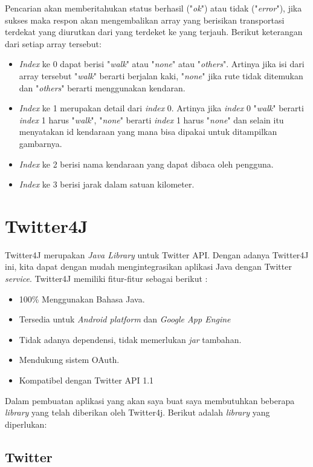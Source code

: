Pencarian akan memberitahukan status berhasil ("\textit{ok}") atau tidak ("\textit{error}"), jika sukses maka respon akan mengembalikan array yang berisikan transportasi terdekat yang diurutkan dari yang terdeket ke yang terjauh. Berikut keterangan dari setiap array tersebut: 
\begin{itemize}
	\item \textit{Index} ke 0 dapat berisi "\textit{walk}" atau "\textit{none}" atau "\textit{others}". Artinya  jika isi dari array tersebut "\textit{walk}" berarti berjalan kaki, "\textit{none}" jika rute tidak ditemukan dan "\textit{others}" berarti menggunakan kendaran.
	\item \textit{Index} ke 1 merupakan detail dari \textit{index} 0. Artinya jika \textit{index} 0 "\textit{walk}" berarti \textit{index} 1 harus "\textit{walk}", "\textit{none}" berarti \textit{index} 1 harus "\textit{none}" dan selain itu menyatakan id kendaraan yang mana bisa dipakai untuk ditampilkan gambarnya.
	\item \textit{Index} ke 2 berisi nama kendaraan yang dapat dibaca oleh pengguna.
	\item \textit{Index} ke 3 berisi jarak dalam satuan kilometer.
\end{itemize}

\section{Twitter4J}
Twitter4J merupakan \textit{Java Library} untuk Twitter API. Dengan adanya Twitter4J ini, kita dapat dengan mudah mengintegrasikan aplikasi Java dengan Twitter \textit{service}. Twitter4J memiliki fitur-fitur sebagai berikut :

\begin{itemize}
	\item 100\% Menggunakan Bahasa Java.
	\item Tersedia untuk \textit{Android platform} dan \textit{Google App Engine}
	\item Tidak adanya dependensi, tidak memerlukan \textit{jar} tambahan.
	\item Mendukung sistem OAuth.
	\item Kompatibel dengan Twitter API 1.1
\end{itemize}

Dalam pembuatan aplikasi yang akan saya buat saya membutuhkan beberapa \textit{library} yang telah diberikan oleh Twitter4j. Berikut adalah \textit{library} yang diperlukan:
\subsection{Twitter}
	
